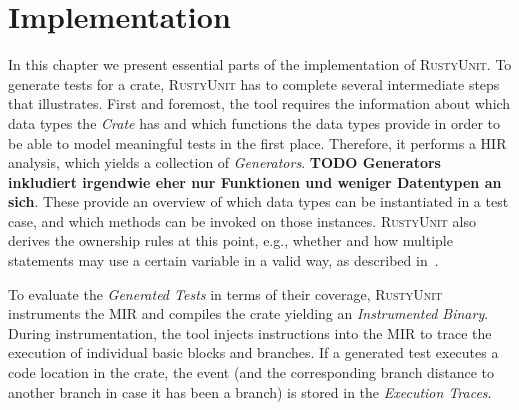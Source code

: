 \documentclass[paper=a4,%
  twoside,%
  BCOR4mm,%
  abstract=true,%
  toc=bibliography,%
  chapterprefix=true,%
  toc=bibliographynumbered,%
  open=right,%
  english,%
  pagesize=pdftex]{scrreprt}
\newcommand{\tech}{\textsc{RustyUnit}\xspace}
\newcommand{\hir}{\ac{HIR}\xspace}
\newcommand{\mir}{\ac{MIR}\xspace}
\begin{document}

\clearpage
\chapter{Implementation}
\label{chap:implementation}
In this chapter we present essential parts of the implementation of \tech. To generate tests for a crate, \tech has to complete several intermediate steps that  illustrates. First and foremost, the tool requires the information about which data types the \emph{Crate} has and which functions the data types provide in order to be able to model meaningful tests in the first place. Therefore, it performs a \hir analysis, which yields a collection of \emph{Generators}. \textbf{TODO Generators inkludiert irgendwie eher nur Funktionen und weniger Datentypen an sich}. These provide an overview of which data types can be instantiated in a test case, and which methods can be invoked on those instances. \tech also derives the ownership rules at this point, e.g., whether and how multiple statements may use a certain variable in a valid way, as described in~. 

To evaluate the \emph{Generated Tests} in terms of their coverage, \tech instruments the \mir and compiles the crate yielding an \emph{Instrumented Binary}. During instrumentation, the tool injects instructions into the \mir to trace the execution of individual basic blocks and branches. If a generated test executes a code location in the crate, the event (and the corresponding branch distance to another branch in case it has been a branch) is stored in the \emph{Execution Traces}. 
\end{document}
